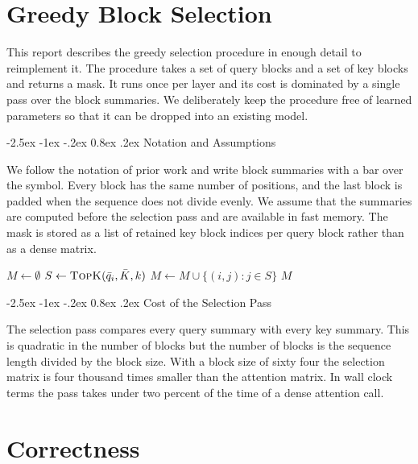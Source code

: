 \documentclass[10pt,twocolumn,a4paper]{article}
\makeatletter
\newcommand{\s}[1]{#1}
\renewcommand\subsection{\@startsection{subsection}{2}{\z@}%
  {-2.5ex \@plus -1ex \@minus -.2ex}%
  {0.8ex \@plus .2ex}%
  {\normalfont\normalsize\bfseries}}
\makeatother
\begin{document}
\section{Greedy Block Selection}

\s{This report describes the greedy selection procedure in enough detail to reimplement it.}
\s{The procedure takes a set of query blocks and a set of key blocks and returns a mask.}
\s{It runs once per layer and its cost is dominated by a single pass over the block summaries.}
\s{We deliberately keep the procedure free of learned parameters so that it can be dropped into an existing model.}

\subsection{Notation and Assumptions}

\s{We follow the notation of prior work and write block summaries with a bar over the symbol.}
\s{Every block has the same number of positions, and the last block is padded when the sequence does not divide evenly.}
\s{We assume that the summaries are computed before the selection pass and are available in fast memory.}
\s{The mask is stored as a list of retained key block indices per query block rather than as a dense matrix.}

\begin{algorithm}[H]
\caption{Greedy block selection}
\label{alg:greedy}
\begin{algorithmic}[1]
\State $M \gets \emptyset$
  \State $S \gets \textsc{TopK}(\bar{q}_i, \bar{K}, k)$
  \State $M \gets M \cup \{(i, j) : j \in S\}$
\EndFor
\State \Return $M$
\end{algorithmic}
\end{algorithm}

\subsection{Cost of the Selection Pass}

\s{The selection pass compares every query summary with every key summary.}
\s{This is quadratic in the number of blocks but the number of blocks is the sequence length divided by the block size.}
\s{With a block size of sixty four the selection matrix is four thousand times smaller than the attention matrix.}
\s{In wall clock terms the pass takes under two percent of the time of a dense attention call.}

\section{Correctness}
\end{document}
